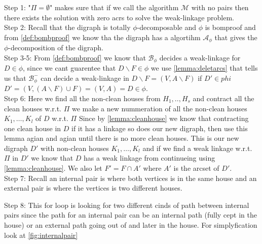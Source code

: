      
    Step 1: "$\Pi=\emptyset$" makes sure that if we call the algorithm $\mathcal{M}$ with no pairs then there exists the solution with zero acrs to solve the weak-linkage problem. \\

    Step 2: Recall that the digraph is totally $\phi$-decomposable and $\phi$ is bomproof and from \autoref{def:bombproof} we know tha the digraph has a algortihm $\mathcal{A}_{\phi}$ that gives the $\phi$-decomposition of the digraph. \\

    Step 3-5: From \autoref{def:bombproof} we know that $\mathcal{B}_{\phi}$ decides a weak-linkage for $D\in \phi$, since we cant guarentee that $D\backslash F \in \phi$ we use \autoref{lemma:deletarcs} that tells us that $\mathcal{B}_{\phi}^-$ can decide a weak-linkage in $D\backslash F=(V,A\backslash F)$ if $D' \in phi$ $D'=(V,(A\backslash F)\cup F)=(V,A)=D\in \phi$. \\

    Step 6: Here we find all the non-clean houses from $H_1,..,H_s$ and contract all the clean houses w.r.t. $\Pi$ we make a new nummeration of all the non-clean houses $K_1,\dots ,K_l$ of $D$ w.r.t. $\Pi$
    Since by \autoref{lemma:cleanhouse} we know that contracting one clean house in $D$ if it has a linkage so does our new digraph, then use this lemma agian and agian until there is no more clean houses.
    This is our new digraph $D'$ with non-clean houses $K_1,\dots,K_l$ and if we find a weak linkage w.r.t. $\Pi$ in $D'$ we know that $D$ has a weak linkage from continueing using \autoref{lemma:cleanhouse}.
    We also let $F'=F\cap A'$ where $A'$ is the arcset of $D'$.\\

    Step 7: Recall an internal pair is where both vertices is in the same house and an external pair is where the vertices is two different houses. 

    Step 8: This for loop is looking for two different cinds of path between internal pairs since the path for an internal pair can be an internal path (fully cept in the house) or an external path going out of and later in the house. 
    For simplyfication look at \autoref{fig:internalpair}
    \begin{figure}
        \label{fig:internalpair}
    \end{figure}

